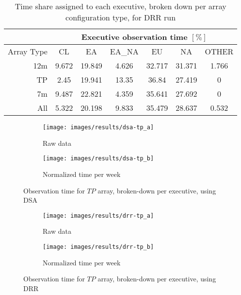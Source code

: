 \begin{table}[h!]
\centering
\begin{tabular}{c|c|c|c|c|c|c|} 
\cline{2-7}
 & \multicolumn{6}{c|}{Executive observation time $[\%]$} \\ \hline
\multicolumn{1}{|r|}{Array Type} & CL	& EA & EA\_NA &	EU & NA & OTHER \\ \hline
\multicolumn{1}{|r|}{12m} & 9.672 & 19.849 & 4.626 & 32.717 & 31.371 & 1.766 \\ \hline
\multicolumn{1}{|r|}{TP} & 2.45 & 19.941 & 13.35 & 36.84 & 27.419 & 0 \\ \hline
\multicolumn{1}{|r|}{7m} & 9.487 & 22.821 & 4.359 & 35.641 & 27.692 & 0 \\ \hline
\multicolumn{1}{|r|}{All} & 5.322 & 20.198 & 9.833 & 35.479 & 28.637 & 0.532 \\ \hline
\end{tabular}
\caption{Time share assigned to each executive, broken down per array configuration type, for DRR run}
\end{table}

\begin{figure}[h!]
\centering
	\begin{subfigure}[b]{0.49\textwidth}
		\texttt{[image: images/results/dsa-tp\_a]}
        \caption{Raw data} 
    \end{subfigure} 
    \begin{subfigure}[b]{0.49\textwidth}
    		\texttt{[image: images/results/dsa-tp\_b]}
            \caption{Normalized time per week} 
    \end{subfigure}
    \caption{Observation time for $TP$ array, broken-down per executive, using DSA}
    \label{fig:dsa-tp-exec}
\end{figure}

\begin{figure}[h!]
\centering
	\begin{subfigure}[b]{0.49\textwidth}
		\texttt{[image: images/results/drr-tp\_a]}
        \caption{Raw data} 
    \end{subfigure} 
    \begin{subfigure}[b]{0.49\textwidth}
    		\texttt{[image: images/results/drr-tp\_b]}
            \caption{Normalized time per week} 
    \end{subfigure}
    \caption{Observation time for $TP$ array, broken-down per executive, using DRR}
    \label{fig:drr-tp-exec}
\end{figure}

